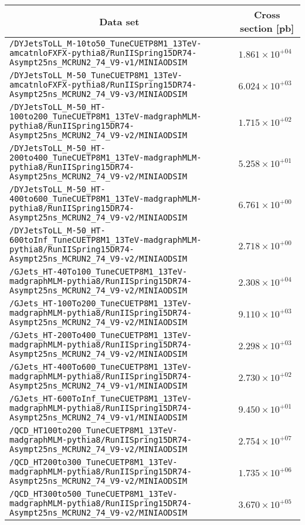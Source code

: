 \begin{center}
\begin{tabular}{ll}
\hline\hline
\multicolumn{1}{c}{Data set}&\multicolumn{1}{c}{Cross section [pb]}\tabularnewline
\hline
\verb!/DYJetsToLL_M-10to50_TuneCUETP8M1_13TeV-amcatnloFXFX-pythia8/RunIISpring15DR74-Asympt25ns_MCRUN2_74_V9-v1/MINIAODSIM! &$1.861\times 10^{+04}$\tabularnewline
\verb!/DYJetsToLL_M-50_TuneCUETP8M1_13TeV-amcatnloFXFX-pythia8/RunIISpring15DR74-Asympt25ns_MCRUN2_74_V9-v3/MINIAODSIM! &$6.024\times 10^{+03}$\tabularnewline
\verb!/DYJetsToLL_M-50_HT-100to200_TuneCUETP8M1_13TeV-madgraphMLM-pythia8/RunIISpring15DR74-Asympt25ns_MCRUN2_74_V9-v2/MINIAODSIM! &$1.715\times 10^{+02}$\tabularnewline
\verb!/DYJetsToLL_M-50_HT-200to400_TuneCUETP8M1_13TeV-madgraphMLM-pythia8/RunIISpring15DR74-Asympt25ns_MCRUN2_74_V9-v2/MINIAODSIM! &$5.258\times 10^{+01}$\tabularnewline
\verb!/DYJetsToLL_M-50_HT-400to600_TuneCUETP8M1_13TeV-madgraphMLM-pythia8/RunIISpring15DR74-Asympt25ns_MCRUN2_74_V9-v2/MINIAODSIM! &$6.761\times 10^{+00}$\tabularnewline
\verb!/DYJetsToLL_M-50_HT-600toInf_TuneCUETP8M1_13TeV-madgraphMLM-pythia8/RunIISpring15DR74-Asympt25ns_MCRUN2_74_V9-v2/MINIAODSIM! &$2.718\times 10^{+00}$\tabularnewline
\verb!/GJets_HT-40To100_TuneCUETP8M1_13TeV-madgraphMLM-pythia8/RunIISpring15DR74-Asympt25ns_MCRUN2_74_V9-v2/MINIAODSIM! &$2.308\times 10^{+04}$\tabularnewline
\verb!/GJets_HT-100To200_TuneCUETP8M1_13TeV-madgraphMLM-pythia8/RunIISpring15DR74-Asympt25ns_MCRUN2_74_V9-v2/MINIAODSIM! &$9.110\times 10^{+03}$\tabularnewline
\verb!/GJets_HT-200To400_TuneCUETP8M1_13TeV-madgraphMLM-pythia8/RunIISpring15DR74-Asympt25ns_MCRUN2_74_V9-v2/MINIAODSIM! &$2.298\times 10^{+03}$\tabularnewline
\verb!/GJets_HT-400To600_TuneCUETP8M1_13TeV-madgraphMLM-pythia8/RunIISpring15DR74-Asympt25ns_MCRUN2_74_V9-v1/MINIAODSIM! &$2.730\times 10^{+02}$\tabularnewline
\verb!/GJets_HT-600ToInf_TuneCUETP8M1_13TeV-madgraphMLM-pythia8/RunIISpring15DR74-Asympt25ns_MCRUN2_74_V9-v1/MINIAODSIM! &$9.450\times 10^{+01}$\tabularnewline
\verb!/QCD_HT100to200_TuneCUETP8M1_13TeV-madgraphMLM-pythia8/RunIISpring15DR74-Asympt25ns_MCRUN2_74_V9-v2/MINIAODSIM! &$2.754\times 10^{+07}$\tabularnewline
\verb!/QCD_HT200to300_TuneCUETP8M1_13TeV-madgraphMLM-pythia8/RunIISpring15DR74-Asympt25ns_MCRUN2_74_V9-v2/MINIAODSIM! &$1.735\times 10^{+06}$\tabularnewline
\verb!/QCD_HT300to500_TuneCUETP8M1_13TeV-madgraphMLM-pythia8/RunIISpring15DR74-Asympt25ns_MCRUN2_74_V9-v2/MINIAODSIM! &$3.670\times 10^{+05}$\tabularnewline

\end{tabular}
\end{center}
